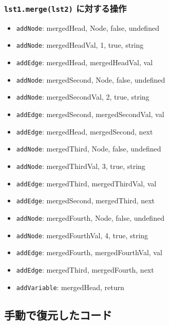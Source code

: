 \documentclass{article}
\begin{document}
\subsubsection{\texttt{lst1.merge(lst2)} に対する操作}
\begin{itemize}
  \item \texttt{addNode}: mergedHead, Node, false, undefined
  \item \texttt{addNode}: mergedHeadVal, 1, true, string
  \item \texttt{addEdge}: mergedHead, mergedHeadVal, val
  \item \texttt{addNode}: mergedSecond, Node, false, undefined
  \item \texttt{addNode}: mergedSecondVal, 2, true, string
  \item \texttt{addEdge}: mergedSecond, mergedSecondVal, val
  \item \texttt{addEdge}: mergedHead, mergedSecond, next
  \item \texttt{addNode}: mergedThird, Node, false, undefined
  \item \texttt{addNode}: mergedThirdVal, 3, true, string
  \item \texttt{addEdge}: mergedThird, mergedThirdVal, val
  \item \texttt{addEdge}: mergedSecond, mergedThird, next
  \item \texttt{addNode}: mergedFourth, Node, false, undefined
  \item \texttt{addNode}: mergedFourthVal, 4, true, string
  \item \texttt{addEdge}: mergedFourth, mergedFourthVal, val
  \item \texttt{addEdge}: mergedThird, mergedFourth, next
  \item \texttt{addVariable}: mergedHead, return
\end{itemize}

\subsection{手動で復元したコード}
\end{document}
